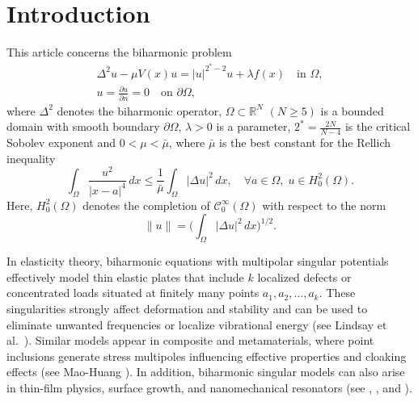 \documentclass[reqno]{amsart}
\begin{document}
\maketitle
{}
\newtheorem{theorem}{Theorem}[section]
\newtheorem{lemma}[theorem]{Lemma}
\newtheorem{proposition}[theorem]{Proposition}
\newtheorem{remark}[theorem]{Remark}
\allowdisplaybreaks

\section{Introduction}

This article concerns the biharmonic problem
\begin{equation}\label{11}
\begin{gathered}
 \Delta^2u-\mu V(x)u=|u|^{2^*-2}u+\lambda f(x)\quad \text{in }\Omega , \\
 u= \frac{\partial u}{\partial n}=0 \quad \text{on }\partial \Omega ,
 \end{gathered}
\end{equation}
where $\Delta^2$ denotes the biharmonic operator, $\Omega\subset\mathbb{R}^N$
$(N\ge5)$ is a bounded domain with smooth boundary $\partial\Omega$, $\lambda>0$
is a parameter, $2^*=\frac{2N}{N-4}$ is the critical Sobolev exponent and
 $0<\mu<\bar\mu$, where $\bar\mu$ is the best constant for the Rellich inequality
\[
\int_\Omega \frac{u^2}{|x-a|^4}\,dx \leq \frac{1}{\bar\mu}
\int_\Omega |\Delta u|^2\,dx,
\quad \forall a\in\Omega,\; u\in H^2_0(\Omega).
\]
Here, $H^2_0(\Omega)$ denotes the completion of $\mathcal{C}^\infty_0(\Omega)$ with
respect to the norm
\[
\|u\|=\Big(\int_\Omega |\Delta u|^2\,dx\Big)^{1/2}.
\]

In elasticity theory, biharmonic equations with multipolar singular potentials
effectively model thin elastic plates that include \(k\) localized defects or
concentrated loads situated at finitely many points \(a_1, a_2,\dots,a_k\).
These singularities strongly affect deformation and stability and can be used to
eliminate unwanted frequencies or localize vibrational energy
(see Lindsay et al.\ \cite{lin}). Similar models appear in composite and metamaterials, where point inclusions generate stress multipoles influencing effective properties and cloaking effects (see Mao-Huang \cite{met}). In addition, biharmonic singular models can also arise in thin-film physics, surface growth, and nanomechanical resonators (see \cite{ek}, \cite{g}, and \cite{gw}).
\end{document}

